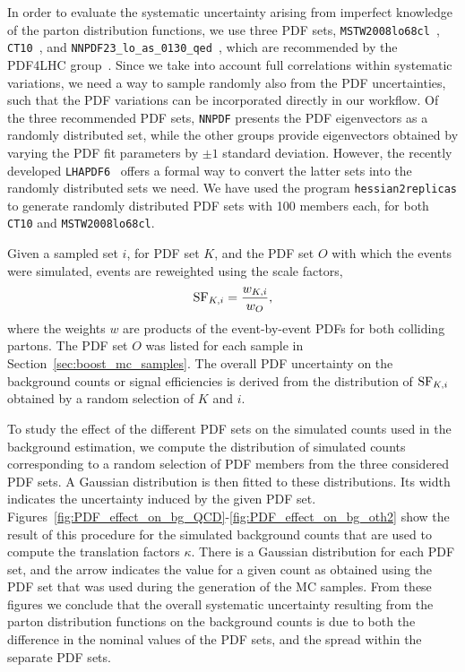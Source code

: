 In order to evaluate the systematic uncertainty arising from imperfect knowledge of the parton
distribution functions, we use three PDF sets, {\tt MSTW2008lo68cl}~\cite{Martin:2009iq},
{\tt CT10}~\cite{Lai:2010vv}, and {\tt NNPDF23\_lo\_as\_0130\_qed}~\cite{nnpdf}, which are
recommended by the PDF4LHC group~\cite{Alekhin:2011sk,Botje:2011sn}.  
Since we take into account full correlations within systematic variations, we need a way to sample
randomly also from the PDF uncertainties, such that the PDF variations can be incorporated directly
in our workflow. 
Of the three recommended PDF sets, {\tt NNPDF} presents the PDF eigenvectors as a randomly
distributed set, while the other groups provide eigenvectors obtained by varying the PDF fit
parameters by $\pm 1$ standard deviation.  
However, the recently developed {\tt LHAPDF6}~\cite{LHAPDF6} offers a formal way to convert the
latter sets into the randomly distributed sets we need.  
We have used the program {\tt hessian2replicas} to generate randomly
distributed PDF sets with 100 members each, for both {\tt CT10} and {\tt MSTW2008lo68cl}.  

Given a sampled set $i$, for PDF set $K$, and the PDF set $O$ with which the events were simulated,
events are reweighted using the scale factors, 
\begin{equation}
{\rm SF}_{K, i} = \frac{w_{K, i}}{w_{O}},
\end{equation}
where the weights $w$ are products of the event-by-event PDFs for both colliding partons.
The PDF set $O$ was listed for each sample in Section~\ref{sec:boost_mc_samples}.
The overall PDF uncertainty on the background counts or signal efficiencies is derived
from the distribution of ${\rm SF}_{K, i}$ obtained by a random selection of $K$ and $i$.  

To study the effect of the different PDF sets on the simulated counts used in the background
estimation, we compute the distribution of simulated counts corresponding to a random selection of
PDF members from the three considered PDF sets. 
A Gaussian distribution is then fitted to these distributions. Its width indicates the uncertainty
induced by the given PDF set. 
Figures~\ref{fig:PDF_effect_on_bg_QCD}-\ref{fig:PDF_effect_on_bg_oth2} show the result of this
procedure for the simulated background counts that are used to compute the translation factors
$\kappa$. 
There is a Gaussian distribution for each PDF set, and the arrow indicates the value for a given
count as obtained using the PDF set that was used during the generation of the MC samples. 
From these figures we conclude that the overall systematic uncertainty resulting from the parton
distribution functions on the background counts is due to both the difference in the nominal values
of the PDF sets, and the spread within the separate PDF sets.


